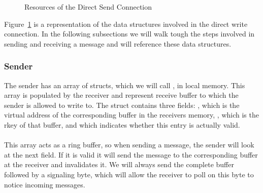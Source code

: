 \begin{figure}[!htb]
\begin{center}
\end{center}
\caption{Resources of the Direct Send Connection}
\label{fig:dirwrite-resources}
\end{figure}

Figure~\ref{fig:dirwrite-resources} is a representation of the data structures involved in the direct write 
connection. In the following subsections we will walk tough the steps involved in sending and receiving a message and
will reference these data structures.

\subsubsection{Sender}

The sender has an array of structs, which we will call , in local memory. This array is populated by the 
receiver and represent receive buffer to which the sender is allowed to write to. The struct contains three fields: 
, which is the virtual address of the corresponding buffer in the receivers memory, , which is the 
rkey of that buffer, and  which indicates whether this entry is actually valid.

\paragraph{} This array acts as a ring buffer, so when sending a message, the sender will look at the next field. If it is
valid it will send the message to the corresponding buffer at the receiver and invalidates it. We will always send the complete
buffer followed by a signaling byte, which will allow the receiver to poll on this byte to notice incoming messages.

